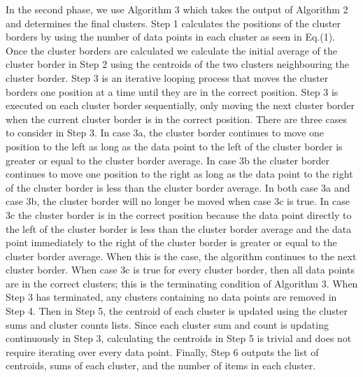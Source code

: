 \documentclass[conference,compsoc]{IEEEtran}
\begin{document}
In the second phase, we use Algorithm 3 which takes the output of Algorithm 2 and determines the final clusters. Step 1 calculates the positions of the cluster borders by using the number of data points in each cluster as seen in Eq.(1). Once the cluster borders are calculated we calculate the initial average of the cluster border in Step 2 using the centroids of the two clusters neighbouring the cluster border. Step 3 is an iterative looping process that moves the cluster borders one position at a time until they are in the correct position. Step 3 is executed on each cluster border sequentially, only moving the next cluster border when the current cluster border is in the correct position. There are three cases to consider in Step 3. In case 3a, the cluster border continues to move one position to the left as long as the data point to the left of the cluster border is greater or equal to the cluster border average. In case 3b the cluster border continues to move one position to the right as long as the data point to the right of the cluster border is less than the cluster border average. In both case 3a and case 3b, the cluster border will no longer be moved when case 3c is true. In case 3c the cluster border is in the correct position because the data point directly to the left of the cluster border is less than the cluster border average and the data point immediately to the right of the cluster border is greater or equal to the cluster border average. When this is the case, the algorithm continues to the next cluster border. When case 3c is true for every cluster border, then all data points are in the correct clusters; this is the terminating condition of Algorithm 3. When Step 3 has terminated, any clusters containing no data points are removed in Step 4. Then in Step 5, the centroid of each cluster is updated using the cluster sums and cluster counts lists. Since each cluster sum and count is updating continuously in Step 3, calculating the centroids in Step 5 is trivial and does not require iterating over every data point. Finally, Step 6 outputs the list of centroids, sums of each cluster, and the number of items in each cluster.
\end{document}
